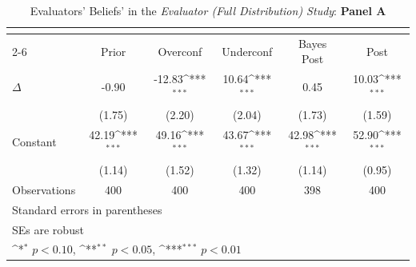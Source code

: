 \begin{table}[htbp]\centering
\def\sym#1{\ifmmode^{#1}\else\(^{#1}\)\fi}
\caption{Evaluators' Beliefs' in the \textit{Evaluator (Full Distribution) Study}: \textbf{Panel A}}
\begin{tabular}{l*{5}{c}}
\hline\hline
                &\multicolumn{5}{c}{}                                                                          \\\cmidrule(lr){2-6}
                &\multicolumn{1}{c}{Prior}&\multicolumn{1}{c}{Overconf}&\multicolumn{1}{c}{Underconf}&\multicolumn{1}{c}{Bayes Post}&\multicolumn{1}{c}{Post}\\
\hline
$\Delta$        &    -0.90         &   -12.83\sym{***}&    10.64\sym{***}&     0.45         &    10.03\sym{***}\\
                &   (1.75)         &   (2.20)         &   (2.04)         &   (1.73)         &   (1.59)         \\
Constant        &    42.19\sym{***}&    49.16\sym{***}&    43.67\sym{***}&    42.98\sym{***}&    52.90\sym{***}\\
                &   (1.14)         &   (1.52)         &   (1.32)         &   (1.14)         &   (0.95)         \\
\hline
Observations    &      400         &      400         &      400         &      398         &      400         \\
\hline\hline
\multicolumn{6}{l}{\footnotesize Standard errors in parentheses}\\
\multicolumn{6}{l}{\footnotesize SEs are robust}\\
\multicolumn{6}{l}{\footnotesize \sym{*} \(p<0.10\), \sym{**} \(p<0.05\), \sym{***} \(p<0.01\)}\\
\end{tabular}
\end{table}
